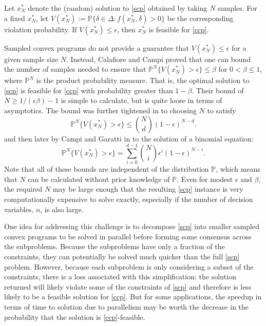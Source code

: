 \documentclass[12pt]{article}
\begin{document}
Let $x_N^*$ denote the (random) solution to \ref{scp} obtained by taking $N$ samples.
For a fixed $x_N^*$, let $V(x_N^*) := \mathbb{P}\{\delta \in \Delta: f(x_N^*, \delta) > 0\}$ be the corresponding violation probability.
If $V(x_N^*) \leq \epsilon$, then $x_N^*$ is feasible for \ref{ccp}.

Sampled convex programs do not provide a guarantee that $V(x_N^*) \leq \epsilon$ for a given sample size $N$.
Instead, Calafiore and Campi \cite{campi05} proved that one can bound the number of samples needed to ensure that $\mathbb{P}^N\{V(x_N^*) > \epsilon\} \leq \beta$ for $0 < \beta \leq 1$,  where $\mathbb{P}^N$ is the product probability measure.
That is, the optimal solution to \ref{scp} is feasible for \ref{ccp} with probability greater than $1 - \beta$.
Their bound of $N \geq 1/(\epsilon\beta) - 1$ is simple to calculate, but is quite loose in terms of asymptotics.
The bound was further tightened in \cite{campi06} to choosing $N$ to satisfy
\[ \mathbb{P}^N\{V(x_N^*) > \epsilon\} \leq \binom{N}{d}(1-\epsilon)^{N-d}. \]
and then later by Campi and Garatti in \cite{campi08} to the solution of a binomial equation:
\[ \mathbb{P}^N\{V(x_N^*) > \epsilon\} = \sum_{i=0}^{d-1} \binom{N}{i} \epsilon^i (1-\epsilon)^{N-i}. \]
Note that all of these bounds are independent of the distribution $\mathbb{P}$, which means that $N$ can be calculated without prior knowledge of $\mathbb{P}$.
Even for modest $\epsilon$ and $\beta$, the required $N$ may be large enough that the resulting \ref{scp} instance is very computationally expensive to solve exactly, especially if the number of decision variables, $n$, is also large.

One idea for addressing this challenge is to decompose \ref{scp} into smaller sampled convex programs to be solved in parallel before forming some consensus across the subproblems.
Because the subproblems have only a fraction of the constraints, they can potentially be solved much quicker than the full \ref{scp} problem.
However, because each subproblem is only considering a subset of the constraints, there is a loss associated with this simplification: the solution returned will likely violate some of the constraints of \ref{scp} and therefore is less likely to be a feasible solution for \ref{ccp}.
But for some applications, the speedup in terms of time to solution due to parallelism may be worth the decrease in the probability that the solution is \ref{ccp}-feasible.
\end{document}

